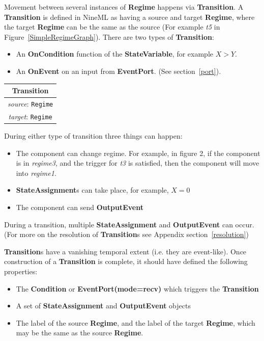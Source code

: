 \documentclass{article}
\newcommand{\nmlClass}[1]{{\bf #1}}
\newcommand{\StateVariable}{{\bf{StateVariable}}\xspace}
\newcommand{\StateAssignment}{{\bf{StateAssignment}}\xspace}
\newcommand{\EventPort}{{\bf{EventPort}}\xspace}
\newcommand{\Regime}{{\bf{Regime}}\xspace}
\newcommand{\Transition}{{\bf{Transition}}\xspace}
\newcommand{\OnEvent}{{\bf{OnEvent}}\xspace}
\newcommand{\OnCondition}{{\bf{OnCondition}}\xspace}
\newcommand{\OutputEvent}{{\bf{OutputEvent}}\xspace}
\begin{document}
Movement between several instances of \Regime happens via \Transition.
A \nmlClass{Transition} is defined in NineML as having
a source and target \nmlClass{Regime}, where the target
\nmlClass{Regime} can be the same as the source (For example \emph{t5}
in Figure~\ref{SimpleRegimeGraph}). There are two types of \Transition:

\begin{itemize}
\item An \OnCondition function of the \StateVariable, for
example $X > Y$.
\item An \OnEvent on an input from \EventPort. (See section~\ref{port}).
\end{itemize}

\begin{table}[htb]
\center
\begin{tabular}{|c|}
\hline
\hline
Transition \\
\hline
\hline
{\em source}: {\tt Regime} \\
\hline
{\em target}: {\tt Regime} \\
\hline
\end{tabular}
\end{table}

During either type of transition three things can happen:
\begin{itemize}
\item The component can change regime. For example, in figure 2, if
the component is in \emph{regime3}, and the trigger for \emph{t3} is
satisfied, then the component will move into \emph{regime1}.
\item \textbf{StateAssignment}s can take place, for example, $X=0$
\item The component can send \OutputEvent
\end{itemize}

During a transition, multiple \StateAssignment and \OutputEvent can occur.
(For more on the resolution of \nmlClass{Transition}s see Appendix
section~\ref{resolution})

\nmlClass{Transition}s have a vanishing temporal extent (i.e. they are
event-like). Once construction of a \nmlClass{Transition} is complete, it
should have defined the following properties:
\begin{itemize}
\item The \nmlClass{Condition} or \nmlClass{EventPort(mode=recv)} which
triggers the \nmlClass{Transition}
\item A set of \StateAssignment and \OutputEvent objects
\item The label of the source \nmlClass{Regime}, and the label of the target
\nmlClass{Regime}, which may be the same as the source \nmlClass{Regime}.
\end{itemize}
\end{document}
